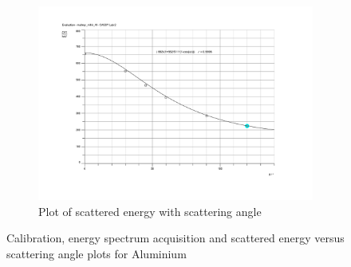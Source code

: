 \documentclass[%
 reprint,
nofootinbib,
 amsmath,amssymb,
 aps,
floatfix,
]{revtex4-2}
\begin{document}
\begin{figure}
\begin{subfigure}[b]{0.48\textwidth}
            \centering
            \includegraphics[scale = 0.069]{Figures/eval_Al_diagram.png}
            \caption{Plot of scattered energy with scattering angle}
            \label{fig:al-3}
        \end{subfigure}
            \caption{Calibration, energy spectrum acquisition and scattered energy versus scattering angle plots for Aluminium}
            \label{fig:al}
    \end{figure}
\end{document}
